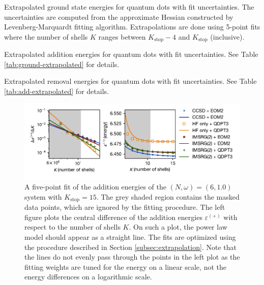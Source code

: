 \begin{table}
  \centering
  \caption{Extrapolated ground state energies for quantum dots with fit uncertainties.  The uncertainties are computed from the approximate Hessian constructed by Levenberg-Marquardt fitting algorithm.  Extrapolations are done using 5-point fits where the number of shells $K$ ranges between $K_{\text{stop}} - 4$ and $K_{\text{stop}}$ (inclusive).}
  \label{tab:ground-extrapolated}
  
\end{table}

\begin{table}
  \centering
  \caption{Extrapolated addition energies for quantum dots with fit uncertainties.  See Table \ref{tab:ground-extrapolated} for details.}
  \label{tab:add-extrapolated}
  
\end{table}

\begin{table}
  \centering
  \caption{Extrapolated removal energies for quantum dots with fit uncertainties.  See Table \ref{tab:add-extrapolated} for details.}
  \label{tab:rm-extrapolated}
  
\end{table}

\begin{figure}
  \centering
  \includegraphics{fig-fit-2-1p0-add}
  \caption{A five-point fit of the addition energies of the $(N, \omega) = (6, 1.0)$ system with $K_{\text{stop}} = 15$.  The grey shaded region contains the masked data points, which are ignored by the fitting procedure.  The left figure plots the central difference of the addition energies $\varepsilon^{(+)}$ with respect to the number of shells $K$.  On such a plot, the power law model should appear as a straight line.  The fits are optimized using the procedure described in Section \ref{subsec:extrapolation}.  Note that the lines do not evenly pass through the points in the left plot as the fitting weights are tuned for the energy on a linear scale, not the energy differences on a logarithmic scale.}
  \label{fig:by-fit-2-1p0-add}
\end{figure}

